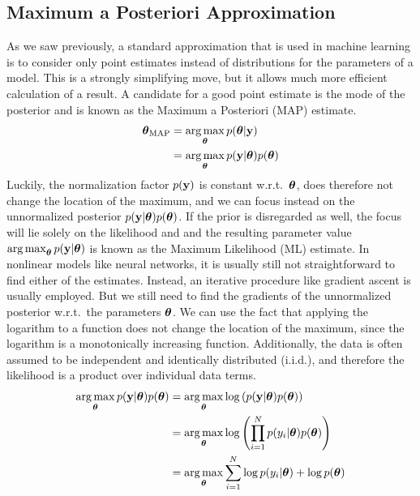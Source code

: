 \documentclass[../thesis.tex]{subfiles}
\begin{document}
\subsection*{Maximum a Posteriori Approximation}
As we saw previously, a standard approximation that is used in machine learning is to consider only point estimates instead of distributions for the parameters of a model. This is a strongly simplifying move, but it allows much more efficient calculation of a result. A candidate for a good point estimate is the mode of the posterior and is known as the Maximum a Posteriori (MAP) estimate.
\begin{align}
    \boldsymbol{\mathbf{\theta}}_{\mathrm{MAP}} &= \operatorname*{arg\,max}_{\boldsymbol{\mathbf{\theta}}} p(\boldsymbol{\mathbf{\theta}} | \boldsymbol{\mathbf{y}}) \\
    &= \operatorname*{arg\,max}_{\boldsymbol{\mathbf{\theta}}} p(\boldsymbol{\mathbf{y}} | \boldsymbol{\mathbf{\theta}}) p(\boldsymbol{\mathbf{\theta}}) \\
\end{align}
Luckily, the normalization factor $p(\boldsymbol{\mathbf{y}})$ is constant w.r.t.\ $\boldsymbol{\mathbf{\theta}}$, does therefore not change the location of the maximum, and we can focus instead on the unnormalized posterior $p(\boldsymbol{\mathbf{y}} | \boldsymbol{\mathbf{\theta}}) p(\boldsymbol{\mathbf{\theta}})$. If the prior is disregarded as well, the focus will lie solely on the likelihood and and the resulting parameter value $\operatorname*{arg\,max}_{\boldsymbol{\mathbf{\theta}}} p(\boldsymbol{\mathbf{y}} | \boldsymbol{\mathbf{\theta}})$ is known as the Maximum Likelihood (ML) estimate. In nonlinear models like neural networks, it is usually still not straightforward to find either of the estimates. Instead, an iterative procedure like gradient ascent is usually employed. But we still need to find the gradients of the unnormalized posterior w.r.t.\ the parameters $\boldsymbol{\mathbf{\theta}}$. We can use the fact that applying the logarithm to a function does not change the location of the maximum, since the logarithm is a monotonically increasing function. Additionally, the data is often assumed to be independent and identically distributed (i.i.d.), and therefore the likelihood is a product over individual data terms. 
\begin{align}
    \operatorname*{arg\,max}_{\boldsymbol{\mathbf{\theta}}} p(\boldsymbol{\mathbf{y}} | \boldsymbol{\mathbf{\theta}}) p(\boldsymbol{\mathbf{\theta}}) &= \operatorname*{arg\,max}_{\boldsymbol{\mathbf{\theta}}} \log \left( p(\boldsymbol{\mathbf{y}} | \boldsymbol{\mathbf{\theta}}) p(\boldsymbol{\mathbf{\theta}}) \right) \\
    &= \operatorname*{arg\,max}_{\boldsymbol{\mathbf{\theta}}} \log \left( \prod_{i=1}^N p(y_i | \boldsymbol{\mathbf{\theta}}) p(\boldsymbol{\mathbf{\theta}}) \right) \\
    &= \operatorname*{arg\,max}_{\boldsymbol{\mathbf{\theta}}} \sum_{i=1}^N \log p(y_i | \boldsymbol{\mathbf{\theta}})  +  \log p(\boldsymbol{\mathbf{\theta}})
\end{align}
\end{document}
